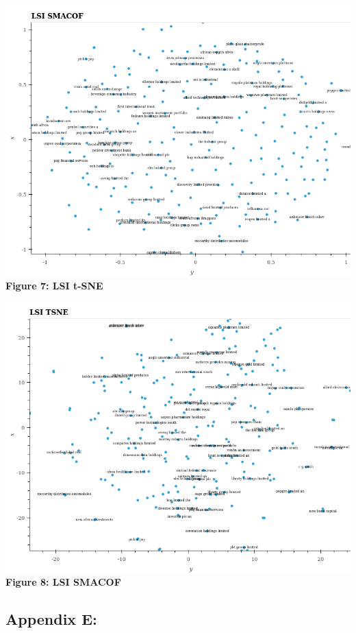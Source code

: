 \documentclass[11pt]{article}
\makeatletter
\def\maxwidth{\ifdim\Gin@nat@width>\linewidth\linewidth
    \else\Gin@nat@width\fi}
\let\Oldincludegraphics\includegraphics
\renewcommand{\includegraphics}[1]{\Oldincludegraphics[width=.8\maxwidth]{#1}}
\makeatother
\begin{document}
\includegraphics{../experiments/media/LSI SMACOF.png}\\

\textbf{Figure 7: LSI t-SNE}

\includegraphics{../experiments/media/LSI TSNE.png}\\

\textbf{Figure 8: LSI SMACOF}

\hypertarget{appendix-e}{%
\subsection{Appendix E:}\label{appendix-e}}
\end{document}
